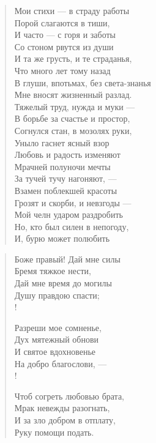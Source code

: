 \newpage
\vspace*{0cm}


\begin{verse}
\begin{altverse}
Мои стихи --- в страду работы\\
    Порой слагаются в тиши,\\
И часто --- с горя и заботы\\
    Со стоном рвутся из души\ldotst\\
И та же грусть, и те страданья,\\
    Что много лет тому назад\\
В глуши, впотьмах, без света-знанья\\
	Мне вносят жизненный разлад.\\
Тяжелый труд, нужда и муки ---\\
    В борьбе за счастье и простор,\\
Согнулся стан, в мозолях руки,\\
    Уныло гаснет ясный взор\ldotst\\
Любовь и радость изменяют\ldotst\\
    Мрачней полуночи мечты\ldotst\\
За тучей тучу нагоняют, ---\\
    Взамен поблекшей красоты\ldotst\\
Грозят и скорби, и невзгоды ---\\
    Мой челн ударом раздробить\ldotse\\
Но, кто был силен в непогоду,\\
    И, бурю может полюбить\ldotst
\end{altverse}
\end{verse}

\newpage
\vspace*{0cm}



\begin{verse}
\begin{altverse}
Боже правый! Дай мне силы\\
    Бремя тяжкое нести,\\
Дай мне время до могилы\\
    Душу правдою спасти;\\!

Разреши мое сомненье,\\
    Дух мятежный обнови\\
И святое вдохновенье\\
    На добро благослови, ---\\!

Чтоб согреть любовью брата,\\
    Мрак невежды разогнать,\\
И за зло добром в отплату,\\
    Руку помощи подать.
\end{altverse}
\end{verse}

